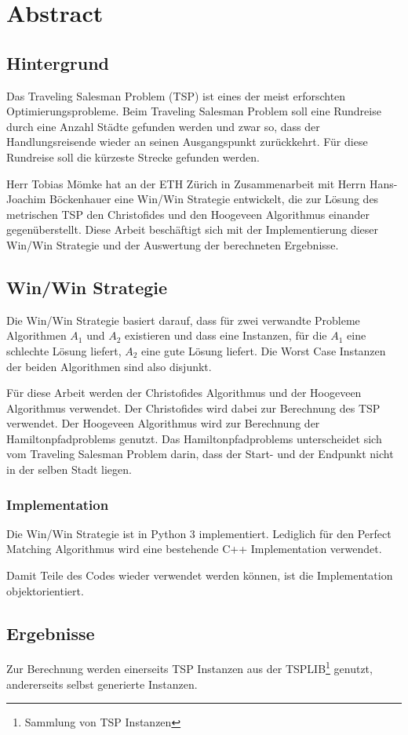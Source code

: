 \documentclass[11pt,a4paper]{article}
\begin{document}
\section{Abstract}
\subsection{Hintergrund}
Das Traveling Salesman Problem (TSP) ist eines der meist erforschten Optimierungsprobleme. Beim Traveling Salesman Problem soll eine Rundreise durch eine Anzahl Städte gefunden werden und zwar so, dass der Handlungsreisende wieder an seinen Ausgangspunkt zurückkehrt. Für diese Rundreise soll die kürzeste Strecke gefunden werden. 

Herr Tobias Mömke hat an der ETH Zürich in Zusammenarbeit mit Herrn Hans-Joachim Böckenhauer eine Win/Win Strategie entwickelt, die zur Lösung des metrischen TSP den Christofides und den Hoogeveen Algorithmus einander gegenüberstellt. Diese Arbeit beschäftigt sich mit der Implementierung dieser Win/Win Strategie und der Auswertung der berechneten Ergebnisse.

\subsection{Win/Win Strategie}
Die Win/Win Strategie basiert darauf, dass für zwei verwandte Probleme Algorithmen $A_1$ und $A_2$ existieren und dass eine Instanzen, für die $A_1$ eine schlechte Lösung liefert, $A_2$ eine gute Lösung liefert. Die Worst Case Instanzen der beiden Algorithmen sind also disjunkt.

Für diese Arbeit werden der Christofides Algorithmus und der Hoogeveen Algorithmus verwendet. Der Christofides wird dabei zur Berechnung des TSP verwendet. Der Hoogeveen Algorithmus wird zur Berechnung der Hamiltonpfadproblems genutzt. Das Hamiltonpfadproblems unterscheidet sich vom Traveling Salesman Problem darin, dass der Start- und der Endpunkt nicht in der selben Stadt liegen.

\subsubsection{Implementation}
Die Win/Win Strategie ist in Python 3 implementiert. Lediglich für den Perfect Matching Algorithmus wird eine bestehende C++ Implementation verwendet.

Damit Teile des Codes wieder verwendet werden können, ist die Implementation objektorientiert. 

\subsection{Ergebnisse}
Zur Berechnung werden einerseits TSP Instanzen aus der TSPLIB\footnote{Sammlung von TSP Instanzen} genutzt, andererseits selbst generierte Instanzen.
\end{document}

